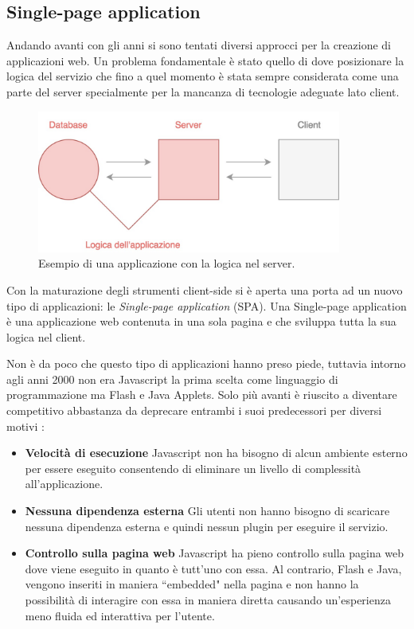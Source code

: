 \subsection{Single-page application}
Andando avanti con gli anni si sono tentati diversi approcci per la creazione di applicazioni web. Un problema fondamentale è stato quello di dove posizionare la logica del servizio che fino a quel momento è stata sempre considerata come una parte del server specialmente per la mancanza di tecnologie adeguate lato client.

\begin{figure}[h]
\centering
\includegraphics[width=10cm]{./images/noSPA}
\caption{Esempio di una applicazione con la logica nel server.}
\end{figure}

Con la maturazione degli strumenti client-side si è aperta una porta ad un nuovo tipo di applicazioni: le \textit{Single-page application} (SPA). Una Single-page application è una applicazione web contenuta in una sola pagina e che sviluppa tutta la sua logica nel client.

Non è da poco che questo tipo di applicazioni hanno preso piede, tuttavia intorno agli anni 2000 non era Javascript la prima scelta come linguaggio di programmazione ma Flash e Java Applets. Solo più avanti è riuscito a diventare competitivo abbastanza da deprecare entrambi i suoi predecessori per diversi motivi \cite{mikowski2013single}:

\begin{itemize}
    \item \textbf{Velocità di esecuzione} Javascript non ha bisogno di alcun ambiente esterno per essere eseguito consentendo di eliminare un livello di complessità all'applicazione.
    \item \textbf{Nessuna dipendenza esterna} Gli utenti non hanno bisogno di scaricare nessuna dipendenza esterna e quindi nessun plugin per eseguire il servizio.
    \item \textbf{Controllo sulla pagina web} Javascript ha pieno controllo sulla pagina web dove viene eseguito in quanto è tutt'uno con essa. Al contrario, Flash e Java, vengono inseriti in maniera “embedded" nella pagina e non hanno la possibilità di interagire con essa in maniera diretta causando un'esperienza meno fluida ed interattiva per l'utente.
\end{itemize}

